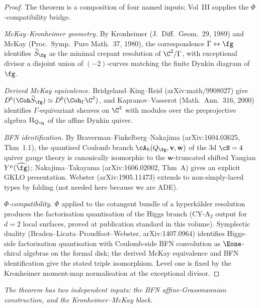\begin{proof}
The theorem is a composition of four named inputs; Vol~III supplies the $\Phi$-compatibility bridge.

\emph{McKay--Kronheimer geometry.} By Kronheimer (J.~Diff.~Geom.\ 29, 1989) and McKay (Proc.~Symp.\ Pure Math.\ 37, 1980), the correspondence $\Gamma \leftrightarrow \fg$ identifies $\widetilde{S}_\fg$ as the minimal crepant resolution of $\C^2/\Gamma$, with exceptional divisor a disjoint union of $(-2)$-curves matching the finite Dynkin diagram of $\fg$.

\emph{Derived McKay equivalence.} Bridgeland--King--Reid (arXiv:math/9908027) give $D^b(\Coh \widetilde{S}_\fg) \simeq D^b(\Coh_\Gamma \C^2)$, and Kapranov--Vasserot (Math.\ Ann.\ 316, 2000) identifies $\Gamma$-equivariant sheaves on $\C^2$ with modules over the preprojective algebra $\Pi_{Q_\fg}$ of the affine Dynkin quiver.

\emph{BFN identification.} By Braverman--Finkelberg--Nakajima (arXiv:1604.03625, Thm~1.1), the quantised Coulomb branch $\cA_\hbar(Q_\fg, \mathbf{v}, \mathbf{w})$ of the 3d $\cN = 4$ quiver gauge theory is canonically isomorphic to the $\mathbf{w}$-truncated shifted Yangian $Y^\mu(\widehat{\fg})$; Nakajima--Takayama (arXiv:1606.02002, Thm~A) gives an explicit GKLO presentation. Webster (arXiv:1905.11473) extends to non-simply-laced types by folding (not needed here because we are ADE).

\emph{$\Phi$-compatibility.} $\Phi$ applied to the cotangent bundle of a hyperk\"ahler resolution produces the factorisation quantisation of the Higgs branch (CY-A$_2$ output for $d = 2$ local surfaces, proved at publication standard in this volume). Symplectic duality (Braden--Licata--Proudfoot--Webster, arXiv:1407.0964) identifies Higgs-side factorisation quantisation with Coulomb-side BFN convolution as $\Eone$-chiral algebras on the formal disk; the derived McKay equivalence and BFN identification give the stated triple isomorphism. Level one is fixed by the Kronheimer moment-map normalisation at the exceptional divisor.
\end{proof}

\noindent\textit{The theorem has two independent inputs: the BFN affine-Grassmannian construction, and the Kronheimer--McKay block.}

